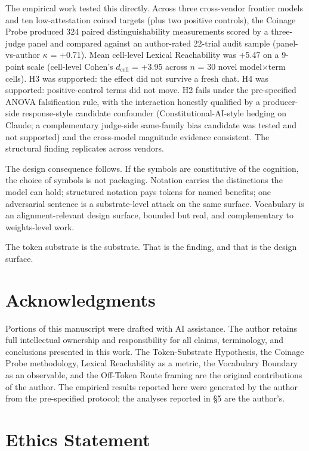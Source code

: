 \documentclass[11pt,a4paper]{article}
\begin{document}
The empirical work tested this directly. Across three cross-vendor frontier models and ten low-attestation coined targets (plus two positive controls), the Coinage Probe produced 324 paired distinguishability measurements scored by a three-judge panel and compared against an author-rated 22-trial audit sample (panel-vs-author $\kappa$ = +0.71). Mean cell-level Lexical Reachability was +5.47 on a 9-point scale (cell-level Cohen's $d_{\text{cell}}$ = +3.95 across $n$ = 30 novel model$\times$term cells). H3 was supported: the effect did not survive a fresh chat. H4 was supported: positive-control terms did not move. H2 fails under the pre-specified ANOVA falsification rule, with the interaction honestly qualified by a producer-side response-style candidate confounder (Constitutional-AI-style hedging on Claude; a complementary judge-side same-family bias candidate was tested and not supported) and the cross-model magnitude evidence consistent. The structural finding replicates across vendors.

The design consequence follows. If the symbols are constitutive of the cognition, the choice of symbols is not packaging. Notation carries the distinctions the model can hold; structured notation pays tokens for named benefits; one adversarial sentence is a substrate-level attack on the same surface. Vocabulary is an alignment-relevant design surface, bounded but real, and complementary to weights-level work.

The token substrate is the substrate. That is the finding, and that is the design surface.

\section*{Acknowledgments}

Portions of this manuscript were drafted with AI assistance. The author retains full intellectual ownership and responsibility for all claims, terminology, and conclusions presented in this work. The Token-Substrate Hypothesis, the Coinage Probe methodology, Lexical Reachability as a metric, the Vocabulary Boundary as an observable, and the Off-Token Route framing are the original contributions of the author. The empirical results reported here were generated by the author from the pre-specified protocol; the analyses reported in \S5 are the author's.

\section*{Ethics Statement}
\end{document}
